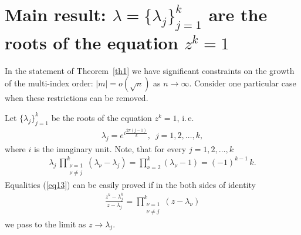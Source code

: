 \documentclass[
11pt,%
tightenlines,%
twoside,%
onecolumn,%
nofloats,%
nobibnotes,%
nofootinbib,%
superscriptaddress,%
noshowpacs,%
centertags]%
{revtex4}
\begin{document}
\section{Main result:
$\lambda=\{\lambda_j\}_{j=1}^k$ are the roots of the equation $z^k=1$}

In the statement of Theorem~\ref{th1} we have significant constraints on
the growth of the multi-index order: $|m|=o(\sqrt{n})$ as
$n\rightarrow\infty$. Consider one particular case when these
restrictions can be removed.

Let $\{\lambda_j\}_{j=1}^k$ be the roots of the equation
    $z^k=1$, i.\,e.
\begin{eqnarray}\label{eq12}
 \lambda_j=e^{i\tfrac{2\pi(j-1)}{k}},\,\,\,
j=1,2,\ldots,k,
\end{eqnarray}
where $i$ is the imaginary unit. Note, that for every $j=1,2,\ldots,k$
\begin{eqnarray}\label{eq13}
\lambda_j\,\prod^{k}_{\substack{
        \nu=1 \\
        \nu\neq j}}
(\lambda_{\nu}-\lambda_j)=\prod^{k}_{
    \nu=2}
(\lambda_{\nu}-1)=(-1)^{k-1}\,k.
\end{eqnarray}
Equalities (\ref{eq13}) can be easily proved if in the both sides of identity
\begin{eqnarray*}
   \frac{z^k-\lambda_j^k}{z-\lambda_j}=\prod^{k}_{\substack{
  \nu=1 \\
  \nu\neq j}}
(z-\lambda_{\nu})
\end{eqnarray*}
we pass to the limit as $z\rightarrow \lambda_j$.
\end{document}
